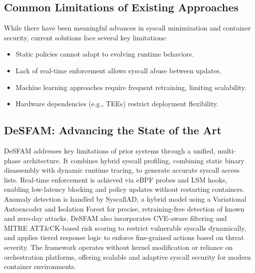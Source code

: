 \subsection{Common Limitations of Existing Approaches}
\label{subsec:common_limitations}

While there have been meaningful advances in syscall minimization and container security, current
solutions face several key limitations:

\begin{itemize}
  \item Static policies cannot adapt to evolving runtime behaviors.
  \item Lack of real-time enforcement allows syscall abuse between updates.
  \item Machine learning approaches require frequent retraining, limiting scalability.
  \item Hardware dependencies (e.g., TEEs) restrict deployment flexibility.
\end{itemize}

\subsection{DeSFAM: Advancing the State of the Art}
\label{subsec:desfam_advancement}

DeSFAM addresses key limitations of prior systems through a unified, multi-phase architecture.
It combines hybrid syscall profiling, combining static binary disassembly with dynamic runtime
tracing, to generate accurate syscall access lists. Real-time enforcement is achieved via eBPF
probes and LSM hooks, enabling low-latency blocking and policy updates without restarting
containers. Anomaly detection is handled by SyscallAD, a hybrid model using a Variational
Autoencoder and Isolation Forest for precise, retraining-free detection of known and zero-day
attacks. DeSFAM also incorporates CVE-aware filtering and MITRE ATT\&CK-based risk scoring to
restrict vulnerable syscalls dynamically, and applies tiered response logic to enforce
fine-grained actions based on threat severity. The framework operates without kernel modification
or reliance on orchestration platforms, offering scalable and adaptive syscall security for
modern container environments.
